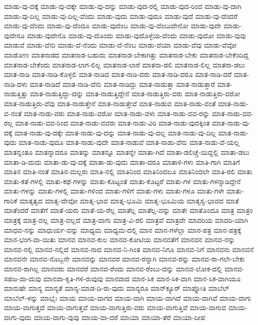{ಮಾಡು-ವು-ದಕ್ಕೆ
ಮಾಡು-ವು-ದಕ್ಕೇ
ಮಾಡು-ವು-ದನ್ನು
ಮಾಡು-ವುದ-ರಲ್ಲಿ
ಮಾಡು-ವುದ-ರಿಂದ
ಮಾಡು-ವು-ದಾಗಿ
ಮಾಡು-ವು-ದಿಲ್ಲ
ಮಾಡು-ವು-ದಿಲ್ಲ-ವೆಂದು
ಮಾಡು-ವುದು
ಮಾಡು-ವುದೂ
ಮಾಡು-ವುದೆ
ಮಾಡು-ವು-ದೆಂದರೆ
ಮಾಡು-ವು-ದೆಂದು
ಮಾಡು-ವು-ದೆಂದೂ
ಮಾಡು-ವುದೆಂಬ
ಮಾಡು-ವು-ದೆಂಬುದೇನೋ
ಮಾಡು-ವುದೇ
ಮಾಡು-ವುದೇನೂ
ಮಾಡು-ವುದೇನೊ
ಮಾಡು-ವು-ದೊಂದು
ಮಾಡು-ವುದೊಳ್ಳೆಯ-ದೆಂದು
ಮಾಡು-ವುದೋ
ಮಾಡು-ವುವು
ಮಾಡುವೆ
ಮಾಡು-ವೆನು
ಮಾಡು-ವೆ-ನೆಂದು
ಮಾಡು-ವೆ-ನೆಂಬ
ಮಾಡು-ವೆಯಾ
ಮಾಡು-ವೆವು
ಮಾಡು-ವೆವೋ
ಮಾಡೋಣ
ಮಾತನಾಡದ
ಮಾತನಾಡ-ಬಹುದು
ಮಾತನಾಡ-ಬೇಕಾಗಿತ್ತು
ಮಾತನಾಡ-ಬೇಕು
ಮಾತನಾಡ-ಬೇಕೆಂದಿದ್ದ
ಮಾತನಾಡ-ಬೇಕೆಂದು
ಮಾತನಾಡ-ಲಾಗ-ಲಿಲ್ಲ
ಮಾತನಾಡ-ಲಾರೆ
ಮಾತನಾ-ಡಲಿ
ಮಾತನಾಡ-ಲಿಲ್ಲ
ಮಾತನಾ-ಡಲು
ಮಾತ-ನಾಡಿ
ಮಾತ-ನಾಡಿ-ಕೊಳ್ಳಲಿ
ಮಾತ-ನಾಡಿದ
ಮಾತ-ನಾಡಿ-ದರು
ಮಾತ-ನಾಡಿ-ದರೂ
ಮಾತ-ನಾಡಿ-ದರೆ
ಮಾತ-ನಾಡಿ-ದಳು
ಮಾತ-ನಾಡಿದೆ
ಮಾತ-ನಾಡಿ-ದೆನು
ಮಾತ-ನಾಡಿದ್ದು
ಮಾತ-ನಾಡುತ್ತಾ
ಮಾತ-ನಾಡುತ್ತಾರೆ
ಮಾತ-ನಾಡುತ್ತಿತ್ತು
ಮಾತ-ನಾಡುತ್ತಿದ್ದು-ದನ್ನು
ಮಾತ-ನಾಡುತ್ತಿದ್ದೇನೆ
ಮಾತ-ನಾಡುತ್ತಿರು-ವರು
ಮಾತ-ನಾಡುತ್ತಿರು-ವರೋ
ಮಾತ-ನಾಡುತ್ತಿರು-ವೆವು
ಮಾತ-ನಾಡುತ್ತೇನೆ
ಮಾತ-ನಾಡುತ್ತೇವೆ
ಮಾತ-ನಾಡುವ
ಮಾತ-ನಾಡು-ವಂತೆ
ಮಾತ-ನಾಡು-ವ-ನಂತೆ
ಮಾತ-ನಾಡು-ವರು
ಮಾತ-ನಾಡು-ವರೋ
ಮಾತ-ನಾಡು-ವಳು
ಮಾತ-ನಾಡು-ವವ-ರನ್ನು
ಮಾತ-ನಾಡು-ವವ-ರಲ್ಲ
ಮಾತ-ನಾಡು-ವವ-ರಿಂದ
ಮಾತ-ನಾಡು-ವವರು
ಮಾತ-ನಾಡು-ವಿರಿ
ಮಾತ-ನಾಡು-ವುದಕ್ಕಿಂತ
ಮಾತ-ನಾಡು-ವು-ದಕ್ಕೆ
ಮಾತ-ನಾಡು-ವು-ದಕ್ಕೇ
ಮಾತ-ನಾಡು-ವು-ದನ್ನು
ಮಾತ-ನಾಡು-ವು-ದಲ್ಲ
ಮಾತ-ನಾಡು-ವು-ದಿಲ್ಲ
ಮಾತ-ನಾಡು-ವುದು
ಮಾತ-ನಾಡು-ವುದೂ
ಮಾತ-ನಾಡು-ವುದೇ
ಮಾತ-ನಾಡುವೆ
ಮಾತ-ನಾಡು-ವೆನು
ಮಾತ-ನಾಡು-ವೆ-ಯಲ್ಲ
ಮಾತನ್ನಂತೂ
ಮಾತನ್ನಾದರೂ
ಮಾತನ್ನು
ಮಾತನ್ನೂ
ಮಾತನ್ನೇ
ಮಾತಾ-ಗಿದೆ
ಮಾತಾ-ಡಲಿಚ್ಚೆ-ಯಿದ್ದಲ್ಲಿ
ಮಾತಾ-ಡಲು
ಮಾತಾ-ಡಿ-ದುದು
ಮಾತಾ-ಡು-ವು-ದಕ್ಕೆ
ಮಾತಾ-ಡು-ವುದು
ಮಾತಾ-ದರೂ
ಮಾತಾಳಿ-ಗಳು
ಮಾತಿ-ಗಾಗಿ
ಮಾತಿಗೆ
ಮಾತಿನ
ಮಾತಿ-ನಂತೆ
ಮಾತಿನ-ಮಲ್ಲರು
ಮಾತಿ-ನಲ್ಲಿ
ಮಾತಿನಿಂದ
ಮಾತಿನಿಂದಲೂ
ಮಾತಿನಿಂದಲೇ
ಮಾತಿ-ರಲಿ
ಮಾತು
ಮಾತು-ಕತೆ-ಗಳಲ್ಲಿ
ಮಾತು-ಕಥೆ-ಗಳನ್ನು
ಮಾತು-ಕೊಟ್ಟಂತೆ
ಮಾತು-ಕೊಟ್ಟರೆ
ಮಾತು-ಗಳ
ಮಾತು-ಗಳನ್ನಾಡಿದ್ದೇನೆ
ಮಾತು-ಗಳನ್ನು
ಮಾತು-ಗಳಲ್ಲಿ
ಮಾತು-ಗಳಿಂದ
ಮಾತು-ಗಳಿಗೆ
ಮಾತು-ಗಳು
ಮಾತು-ಗಳೂ
ಮಾತು-ಗಳೇ
ಮಾತು-ಗಾರಿಕೆ
ಮಾತೃತ್ವದ
ಮಾತೃ-ದೇವೋ
ಮಾತೃ-ಭಾವ
ಮಾತೃ-ಭೂಮಿ
ಮಾತೃ-ಭೂಮಿಯ
ಮಾತೃಸ್ವ-ಭಾವದ
ಮಾತೆ
ಮಾತೆಂದರೆ
ಮಾತೆಗೆ
ಮಾತೆ-ಯರು
ಮಾತೆ-ಯ-ರೆಲ್ಲ
ಮಾತೆಲ್ಲ
ಮಾತೆಲ್ಲ-ವನ್ನು
ಮಾತೇ
ಮಾತೊಂದೂ
ಮಾತ್ರ
ಮಾತ್ರಂ
ಮಾತ್ರಕ್ಕೆ
ಮಾತ್ರ-ವಲ್ಲ
ಮಾತ್ರ-ವಲ್ಲದೆ
ಮಾತ್ರ-ವಾಗು
ಮಾತ್ರ-ವಿ-ರಲಿ
ಮಾತ್ರವೆ
ಮಾತ್ರವೇ
ಮಾದರಿಯ
ಮಾದರಿ-ಯಾಗಿ
ಮಾಧವ-ನನ್ನು
ಮಾಧುರ್ಯ-ವನ್ನು
ಮಾಧ್ಯಮ
ಮಾಧ್ಯಮ-ದಲ್ಲಿ
ಮಾನ
ಮಾನ-ಗಳೆಲ್ಲಾ
ಮಾನ-ಪತ್ರ
ಮಾನ-ಪತ್ರಕ್ಕೆ
ಮಾನ-ಭಂಗ-ವಾ-ಯಿತು
ಮಾನವ
ಮಾನವ-ಕುಲ
ಮಾನವ-ಕೋಟಿಯ
ಮಾನವತೆಗೆ
ಮಾನವನ
ಮಾನವ-ನನ್ನು
ಮಾನವ-ನಲ್ಲಿ
ಮಾನವ-ನಲ್ಲಿದೆ
ಮಾನವ-ನಾದ
ಮಾನವ-ನಿ-ಗಿಂತ
ಮಾನವ-ನಿಗೂ
ಮಾನವ-ನಿಗೆ
ಮಾನವನು
ಮಾನವನೆ
ಮಾನವನೇ
ಮಾನವ-ನೊಬ್ಬನೇ
ಮಾನವನ್ನು
ಮಾನವರ
ಮಾನವ-ರನ್ನಾಗಿ
ಮಾನವ-ರನ್ನು
ಮಾನವ-ರಾ-ಗಲೇ-ಬೇಕು
ಮಾನವ-ರಾಗಿಲ್ಲ
ಮಾನವರು
ಮಾನವರೆ
ಮಾನವ-ರೆಂದು
ಮಾನವ-ರೆಂಬು-ದನ್ನು
ಮಾನವ-ಲೋಕ-ದಲ್ಲಿ
ಮಾನವ-ಸಹಜ-ವಾ-ದುವು
ಮಾನವಾ-ಕೃತಿ-ಗಳಿ-ರುವುವು
ಮಾನವಾದ
ಮಾನ-ಸಿಕ
ಮಾನ-ಸಿಕ-ವಾಗಿ
ಮಾನ-ಸಿಕ-ವಾಗಿಯೂ
ಮಾನುಷೇ
ಮಾನ್ಯ
ಮಾನ್ಯತೆ
ಮಾನ್ಯ-ಮಾಡ-ದಿ-ರು-ವುದು
ಮಾನ್ಯರೂ
ಮಾನ್‌ಕ್ಯೂರ್
ಮಾಪ್ನೋತಿ
ಮಾಬೆಲ್
ಮಾಬೆಲ್‌-ಳನ್ನು
ಮಾಭೈಃ
ಮಾಯ
ಮಾಯ-ವಾಗದ
ಮಾಯ-ವಾಗಿ
ಮಾಯ-ವಾಗಿದೆ
ಮಾಯ-ವಾಗಿವೆ
ಮಾಯ-ವಾಗು
ಮಾಯ-ವಾಗುತ್ತದೆ
ಮಾಯ-ವಾಗುತ್ತವೆ
ಮಾಯ-ವಾಗುತ್ತಿರು-ವರು
ಮಾಯ-ವಾಗುತ್ತಿವೆ
ಮಾಯ-ವಾಗುವ
ಮಾಯ-ವಾಗು-ವುದು
ಮಾಯ-ವಾಗು-ವುವು
ಮಾಯ-ವಾ-ದರೆ
ಮಾಯಾ
ಮಾಯಾ-ತೆರೆ
ಮಾಯಾ-ದೀಪ
}
